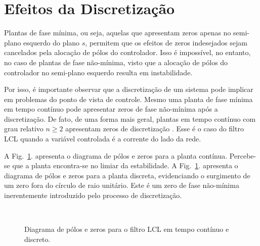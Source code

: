 \section{Efeitos da Discretização}

  Plantas de fase mínima, ou seja, aquelas que apresentam zeros apenas no semi-plano esquerdo do plano $s$, permitem que os efeitos de zeros indesejados sejam cancelados pela alocação de pólos do controlador. Isso é impossível, no entanto, no caso de plantas de fase não-mínima, visto que a alocação de pólos do controlador no semi-plano esquerdo resulta em instabilidade.

  Por isso, é importante observar que a discretização de um sistema pode implicar em problemas do ponto de vista de controle. Mesmo uma planta de fase mínima em tempo contínuo pode apresentar zeros de fase não-mínima após a discretização. De fato, de uma forma mais geral, plantas em tempo contínuo com grau relativo $n \ge 2$ apresentam zeros de discretização \cite{ref:ASTROM}. Esse é o caso do filtro LCL quando a variável controlada é a corrente do lado da rede.


  A Fig.~\ref{fig:pzmap_planta}. apresenta o diagrama de pólos e zeros para a planta contínua. Percebe-se que a planta encontra-se no limiar da estabilidade. A Fig.~\ref{fig:pzmap_planta}. apresenta o diagrama de pólos e zeros para a planta discreta, evidenciando o surgimento de um zero fora do círculo de raio unitário. Este é um zero de fase não-mínima inerentemente introduzido pelo processo de discretização.

  \begin{figure}[htb]
    \centering
    \\
    \renewcommand\figurename{Fig.}
    \caption{Diagrama de pólos e zeros para o filtro LCL em tempo contínuo e discreto.}
    \label{fig:pzmap_planta}
  \end{figure}


